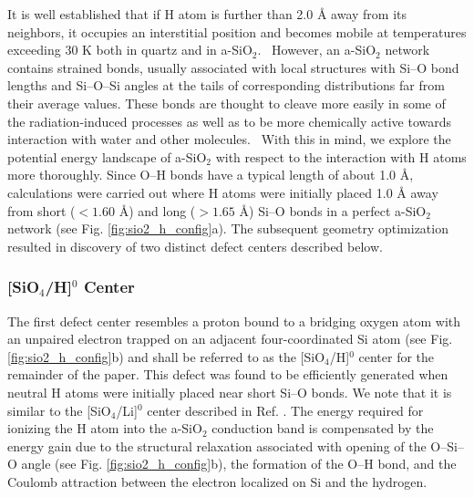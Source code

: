 \documentclass[aps,prb,reprint,superscriptaddress,showpacs]{revtex4-1}
\begin{document}
It is well established that if H atom is further than 2.0 {\AA} away from its neighbors, it occupies an interstitial position and becomes mobile at temperatures exceeding 30 K both in quartz and in a-SiO$_2$.~\cite{skuja_hdiffusion,godet_hydrogen,blochl_vacancies} However, an a-SiO$_2$ network contains strained bonds, usually associated with local structures with \mbox{Si--O} bond lengths and \mbox{Si--O--Si} angles at the tails of corresponding distributions far from their average values. These bonds are thought to cleave more easily in some of the radiation-induced processes as well as to be more chemically active towards interaction with water and other molecules.~\cite{awazu} With this in mind, we explore the potential energy landscape of a-SiO$_2$ with respect to the interaction with H atoms more thoroughly. Since \mbox{O--H} bonds have a typical length of about 1.0 {\AA}, calculations were carried out where H atoms were initially placed 1.0 {\AA} away from short ($< 1.60$ {\AA}) and long ($> 1.65$ {\AA}) \mbox{Si--O} bonds in a perfect a-SiO$_2$ network (see Fig. \ref{fig:sio2_h_config}a). The subsequent geometry optimization resulted in discovery of two distinct defect centers described below.

\subsubsection{[SiO$_4$/H]$^0$ Center}

The first defect center resembles a proton bound to a bridging oxygen atom with an unpaired electron trapped on an adjacent four-coordinated Si atom (see Fig. \ref{fig:sio2_h_config}b) and shall be referred to as the [SiO$_4$/H]$^0$ center for the remainder of the paper. This defect was found to be efficiently generated when neutral H atoms were initially placed near short \mbox{Si--O} bonds. We note that it is similar to the [SiO$_4$/Li]$^0$ center described in Ref. \cite{aelsayed_prb}. The energy required for ionizing the H atom into the a-SiO$_2$ conduction band is compensated by the energy gain due to the structural relaxation associated with opening of the \mbox{O--Si--O} angle (see Fig. \ref{fig:sio2_h_config}b), the formation of the \mbox{O--H} bond, and the Coulomb attraction between the electron localized on Si and the hydrogen. 
\end{document}
